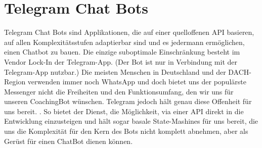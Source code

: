 \section{Telegram Chat Bots}
Telegram Chat Bots sind Applikationen, die auf einer quelloffenen API \cite{telegramAPI} basieren, auf allen Komplexitätsstufen adaptierbar sind und es jedermann ermöglichen, einen Chatbot zu bauen. Die einzige suboptimale Einschränkung besteht im Vendor Lock-In der Telegram-App. (Der Bot ist nur in Verbindung mit der Telegram-App \cite{telegram} nutzbar.) Die meisten Menschen in Deutschland und der DACH-Region verwenden immer noch WhatsApp \cite{Nutzerzahlen} und doch bietet uns der populärste Messenger nicht die Freiheiten und den Funktionsumfang, den wir uns für unseren CoachingBot wünschen. Telegram jedoch hält genau diese Offenheit für uns bereit. \cite{telegramVergleich}. So bietet der Dienst, die Möglichkeit, via einer API direkt in die Entwicklung einzusteigen und hält sogar basale State-Mashines für uns bereit, die uns die Komplexität für den Kern des Bots nicht komplett abnehmen, aber als Gerüst für einen ChatBot dienen können.


